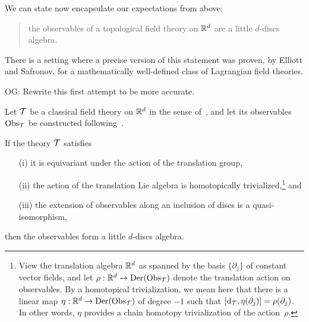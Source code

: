 \documentclass[11pt]{amsart}
\def\owen#1{{\textcolor{violet!50!black}{OG: {#1}}}}
\begin{document}
We can state now encapsulate our expectations from above:
\begin{quote}
the observables of a topological field theory on $\mathbb R^d$ are a little $d$-discs algebra.
\end{quote}
There is a setting where a precise version of this statement was proven, by Elliott and Safronov, for a mathematically well-defined class of Lagrangian field theories.

\owen{Rewrite this first attempt to be more accurate.}

\begin{thm}
\label{thm: EllSaf}
Let $\mathcal T$ be a classical field theory on $\mathbb R^d$ in the sense of~\cite{CosBook},
and let its observables ${\rm Obs}_\mathcal T$ be constructed following~\cite{CG2}.

If the theory $\mathcal T$ satisfies 
\begin{enumerate}
\item[(i)] it is equivariant under the action of the translation group,
\item[(ii)] the action of the translation Lie algebra is homotopically trivialized,\footnote{View the translation algebra $\mathbb R^d$ as spanned by the basis $\{\partial_j\}$ of constant vector fields, and let $\rho: \mathbb R^d \to {\rm Der}({\rm Obs}_\mathcal T)$ denote the translation action on observables.
By a homotopical trivialization, we mean here that there is a linear map $\eta: \mathbb R^d \to {\rm Der}({\rm Obs}_\mathcal T)$ of degree $-1$ such that $[{\rm d}_{\mathcal T}, \eta(\partial_j)] = \rho(\partial_j)$.
In other words, $\eta$ provides a chain homotopy trivialization of the action~$\rho$.} 
and
\item[(iii)] the extension of observables along an inclusion of discs is a quasi-isomorphism,
\end{enumerate}
then the observables form a little $d$-discs algebra.
\end{thm}
\end{document}
